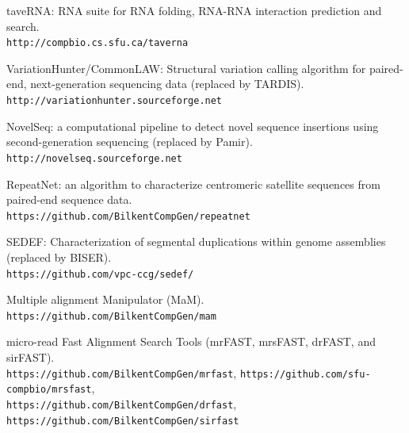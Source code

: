 \begin{list2}
\item
  taveRNA: RNA suite for RNA folding, RNA-RNA interaction prediction and search. \\
  {\tt http://compbio.cs.sfu.ca/taverna}
\item
  VariationHunter/CommonLAW: Structural variation calling algorithm for paired-end, next-generation sequencing data (replaced by TARDIS).
  {\tt http://variationhunter.sourceforge.net}
\item
  NovelSeq: a computational pipeline to detect novel sequence insertions using second-generation sequencing (replaced by Pamir).
  {\tt http://novelseq.sourceforge.net}
\item
  RepeatNet: an algorithm to characterize centromeric satellite sequences from paired-end sequence data.\\
  {\tt https://github.com/BilkentCompGen/repeatnet}
  \item
  SEDEF: Characterization of segmental duplications within genome assemblies (replaced by BISER).\\
  {\tt https://github.com/vpc-ccg/sedef/}
  \item
  Multiple alignment Manipulator (MaM).\\
  {\tt https://github.com/BilkentCompGen/mam}
\item
  micro-read Fast Alignment Search Tools (mrFAST, mrsFAST, drFAST, and sirFAST).\\
  {\tt https://github.com/BilkentCompGen/mrfast},
  {\tt https://github.com/sfu-compbio/mrsfast},\\
  {\tt https://github.com/BilkentCompGen/drfast},
  {\tt https://github.com/BilkentCompGen/sirfast}
\end{list2}





